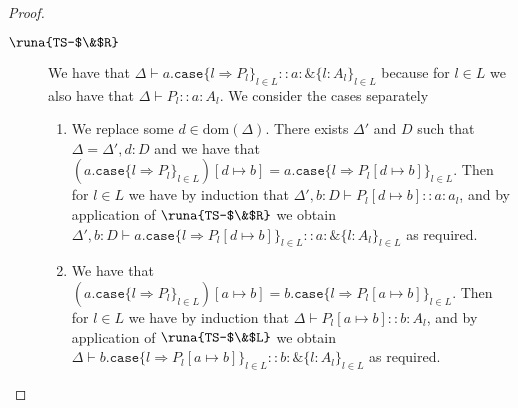\begin{lemma}
\begin{proof}
\begin{description}
\item[$\runa{TS-$\&$R}$] We have that $\Delta\vdash a.\texttt{case}\{l\Rightarrow P_l\}_{l\in L} :: a\!:\!\&\{l:A_l\}_{l\in L}$ because for $l\in L$ we also have that $\Delta \vdash P_l :: a\!:\!A_l$. We consider the cases separately
\begin{enumerate}
    \item We replace some $d\in\text{dom}(\Delta)$. There exists $\Delta'$ and $D$ such that $\Delta=\Delta',d:D$ and we have that $(a.\texttt{case}\{l\Rightarrow P_l\}_{l\in L})[d\mapsto b]=a.\texttt{case}\{l\Rightarrow P_l[d\mapsto b]\}_{l\in L}$. Then for $l\in L$ we have by induction that $\Delta',b:D\vdash P_l[d\mapsto b] :: a\!:\!a_l$, and by application of $\runa{TS-$\&$R}$ we obtain $\Delta',b:D\vdash a.\texttt{case}\{l\Rightarrow P_l[d\mapsto b]\}_{l\in L} :: a\!:\!\&\{l:A_l\}_{l\in L}$ as required.
    
    \item We have that $(a.\texttt{case}\{l\Rightarrow P_l\}_{l\in L})[a\mapsto b]=b.\texttt{case}\{l\Rightarrow P_l[a\mapsto b]\}_{l\in L}$. Then for $l\in L$ we have by induction that $\Delta\vdash P_l[a\mapsto b] :: b\!:\!A_l$, and by application of $\runa{TS-$\&$L}$ we obtain $\Delta\vdash b.\texttt{case}\{l\Rightarrow P_l[a\mapsto b]\}_{l\in L} :: b\!:\!\&\{l:A_l\}_{l\in L}$ as required.
\end{enumerate}



\end{description}
\end{proof}
\end{lemma}
